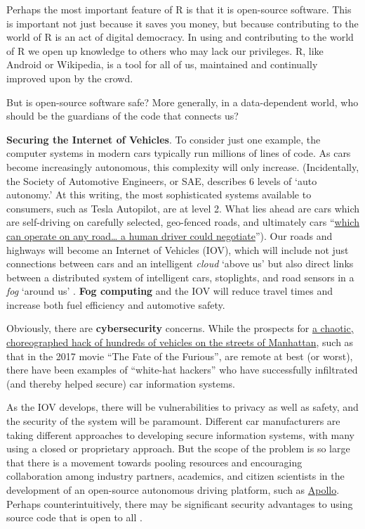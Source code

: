 \documentclass[openany]{book}
\begin{document}
Perhaps the most important feature of R is that it is open-source software. This is important not just because it saves you money, but because contributing to the world of R is an act of digital democracy. In using and contributing to the world of R we open up knowledge to others who may lack our privileges. R, like Android or Wikipedia, is a tool for all of us, maintained and continually improved upon by the crowd.

But is open-source software safe? More generally, in a data-dependent world, who should be the guardians of the code that connects us?

\textbf{Securing the Internet of Vehicles}. To consider just one example, the computer systems in modern cars typically run millions of lines of code. As cars become increasingly autonomous, this complexity will only increase. (Incidentally, the Society of Automotive Engineers, or SAE, describes 6 levels of `auto autonomy.' At this writing, the most sophisticated systems available to consumers, such as Tesla Autopilot, are at level 2. What lies ahead are cars which are self-driving on carefully selected, geo-fenced roads, and ultimately cars ``\href{https://www.caranddriver.com/features/a15079828/autonomous-self-driving-car-levels-car-levels/}{which can operate on any road\ldots{} a human driver could negotiate}''). Our roads and highways will become an Internet of Vehicles (IOV), which will include not just connections between cars and an intelligent \emph{cloud} `above us' but also direct links between a distributed system of intelligent cars, stoplights, and road sensors in a \emph{fog} `around us' \citep{bonomi2012fog}. \textbf{Fog computing} and the IOV will reduce travel times and increase both fuel efficiency and automotive safety.

Obviously, there are \textbf{cybersecurity} concerns. While the prospects for \href{https://www.youtube.com/watch?v=OvewYslou9g}{a chaotic, choreographed hack of hundreds of vehicles on the streets of Manhattan}, such as that in the 2017 movie ``The Fate of the Furious'', are remote at best (or worst), there have been examples of ``white-hat hackers'' who have successfully infiltrated (and thereby helped secure) car information systems.

As the IOV develops, there will be vulnerabilities to privacy as well as safety, and the security of the system will be paramount. Different car manufacturers are taking different approaches to developing secure information systems, with many using a closed or proprietary approach. But the scope of the problem is so large that there is a movement towards pooling resources and encouraging collaboration among industry partners, academics, and citizen scientists in the development of an open-source autonomous driving platform, such as \href{http://apollo.auto/}{Apollo}. Perhaps counterintuitively, there may be significant security advantages to using source code that is open to all \citep{clarke2009open, fitzgerald2016open}.
\end{document}
